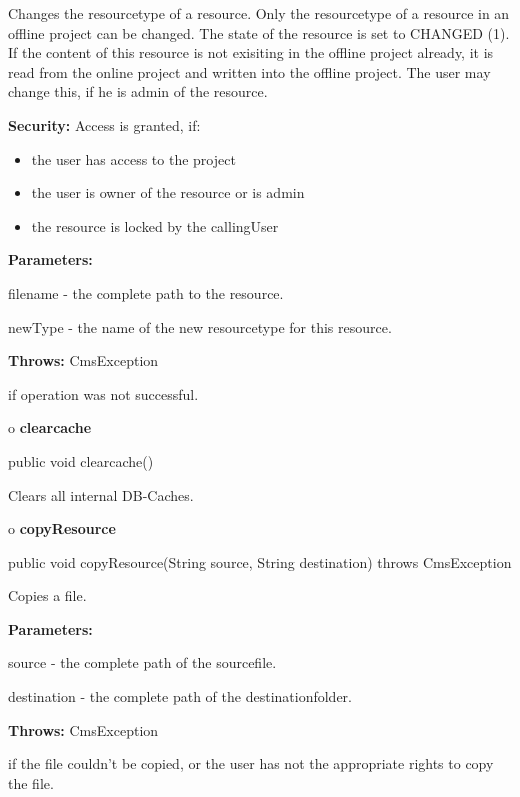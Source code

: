 \begin{description}
\htmlDD Changes the resourcetype of a resource. \htmlBR
Only the resourcetype of a resource in an offline project can be changed. The
state of the resource is set to CHANGED (1). If the content of this resource
is not exisiting in the offline project already, it is read from the online
project and written into the offline project. The user may change this, if he
is admin of the resource.

{\bf Security:} Access is granted, if:

\begin{itemize}
\item the user has access to the project
\item the user is owner of the resource or is admin
\item the resource is locked by the callingUser
\end{itemize}

\begin{description}
\item {\bf Parameters:}

filename - the complete path to the resource.

newType - the name of the new resourcetype for this resource.
\item {\bf Throws:} CmsException

if operation was not successful.
\end{description}

\end{description}

o {\bf clearcache}

\begin{PRE}
 public void clearcache()
\end{PRE}

\begin{description}
\htmlDD Clears all internal DB-Caches.

\end{description}

o {\bf copyResource}

\begin{PRE}
 public void copyResource(String source,
                          String destination) throws CmsException
\end{PRE}

\begin{description}
\htmlDD Copies a file.

\begin{description}
\item {\bf Parameters:}

source - the complete path of the sourcefile.

destination - the complete path of the destinationfolder.
\item {\bf Throws:} CmsException

if the file couldn't be copied, or the user has not the appropriate rights to
copy the file.
\end{description}

\end{description}

